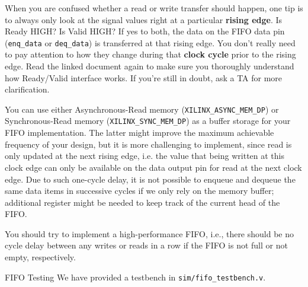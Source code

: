 \documentclass[11pt]{article}
\makeatletter
\renewcommand{\subsection}
{\@startsection {subsection}{1}{0pt}
 {-1ex}
 {0.5ex}
 {\bfseries\normalsize}}
\makeatother
\begin{document}
When you are confused whether a read or write transfer should happen, one tip is to always only look at the signal values right at a particular \textbf{rising edge}. Is Ready HIGH? Is Valid HIGH? If yes to both, the data on the FIFO data pin (\verb|enq_data| or \verb|deq_data|) is transferred at that rising edge. You don't really need to pay attention to how they change during that \textbf{clock cycle} prior to the rising edge. Read the linked document again to make sure you thoroughly understand how Ready/Valid interface works. If you're still in doubt, ask a TA for more clarification.

You can use either Asynchronous-Read memory (\verb|XILINX_ASYNC_MEM_DP|) or Synchronous-Read memory (\verb|XILINX_SYNC_MEM_DP|) as a buffer storage for your FIFO implementation. The latter might improve the maximum achievable frequency of your design, but it is more challenging to implement, since read is only updated at the next rising edge, i.e. the value that being written at this clock edge can only be available on the data output pin for read at the next clock edge. Due to such one-cycle delay, it is not possible to enqueue and dequeue the same data items in successive cycles if we only rely on the memory buffer; additional register might be needed to keep track of the current head of the FIFO.

You should try to implement a high-performance FIFO, i.e., there should be no cycle delay between any writes or reads in a row if the FIFO is not full or not empty, respectively.

\subsection{FIFO Testing}
We have provided a testbench in \verb|sim/fifo_testbench.v|.
\end{document}
